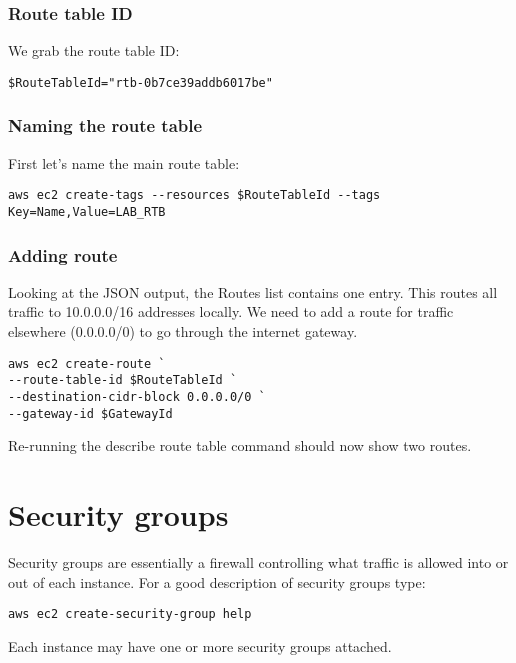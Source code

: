 \subsubsection{Route table ID}

We grab the route table ID:
\begin{verbatim}
$RouteTableId="rtb-0b7ce39addb6017be"
\end{verbatim}

\subsubsection{Naming the route table}

First let's name the main route table:

\begin{verbatim}
aws ec2 create-tags --resources $RouteTableId --tags Key=Name,Value=LAB_RTB
\end{verbatim}

\subsubsection{Adding route}

Looking at the JSON output, the Routes list contains one entry. This
routes all traffic to 10.0.0.0/16 addresses locally. We need to add a
route for traffic elsewhere (0.0.0.0/0) to go through the internet
gateway.

\begin{verbatim}
aws ec2 create-route `
--route-table-id $RouteTableId `
--destination-cidr-block 0.0.0.0/0 `
--gateway-id $GatewayId
\end{verbatim}

Re-running the describe route table command should now show two routes.

\section{Security groups}
\label{security-groups}

Security groups are essentially a firewall controlling what traffic is
allowed into or out of each instance. For a good description of security
groups type:

\begin{verbatim}
aws ec2 create-security-group help
\end{verbatim}

Each instance may have one or more security groups attached.

